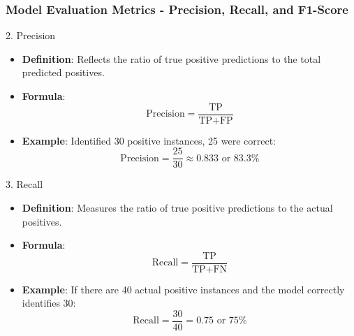\documentclass[aspectratio=169]{beamer}
\begin{document}
\begin{frame}[fragile]
    \frametitle{Model Evaluation Metrics - Precision, Recall, and F1-Score}
    \begin{block}{2. Precision}
        \begin{itemize}
            \item \textbf{Definition}: Reflects the ratio of true positive predictions to the total predicted positives.
            \item \textbf{Formula}:
            \begin{equation}
                \text{Precision} = \frac{\text{TP}}{\text{TP} + \text{FP}}
            \end{equation}
            \item \textbf{Example}: Identified 30 positive instances, 25 were correct:
            \begin{equation}
                \text{Precision} = \frac{25}{30} \approx 0.833 \text{ or } 83.3\%
            \end{equation}
        \end{itemize}
    \end{block}
    
    \begin{block}{3. Recall}
        \begin{itemize}
            \item \textbf{Definition}: Measures the ratio of true positive predictions to the actual positives.
            \item \textbf{Formula}:
            \begin{equation}
                \text{Recall} = \frac{\text{TP}}{\text{TP} + \text{FN}}
            \end{equation}
            \item \textbf{Example}: If there are 40 actual positive instances and the model correctly identifies 30:
            \begin{equation}
                \text{Recall} = \frac{30}{40} = 0.75 \text{ or } 75\%
            \end{equation}
        \end{itemize}
    \end{block}
    

\end{frame}
\end{document}
